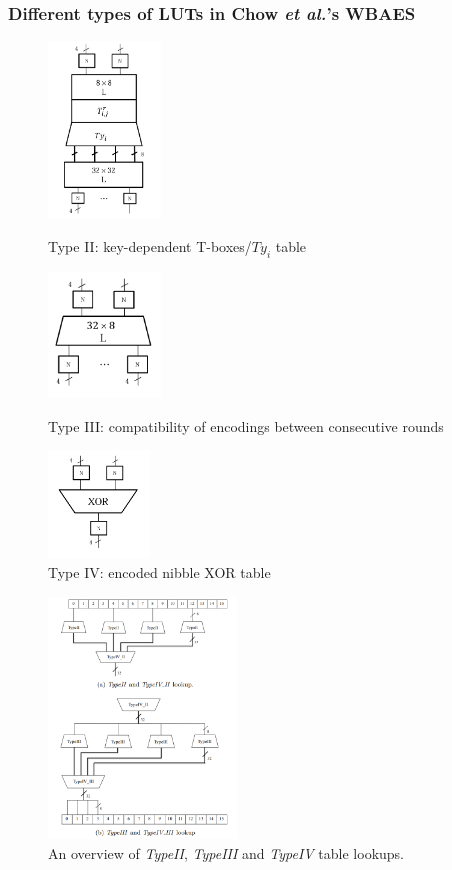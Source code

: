 \documentclass{beamer}
\begin{document}
\frame
{
	\frametitle{Different types of LUTs in Chow \textit{et al.}'s WBAES}
	\begin{figure}
		\centering
		\begin{minipage}[b]{0.3\textwidth}
			\includegraphics[width=3cm]{./pics/TMC.png}
			\caption{Type II: key-dependent T-boxes/$Ty_i$ table}
		\end{minipage}%
		\hspace{0.04\textwidth}%
		\begin{minipage}[b]{0.3\textwidth}
			\includegraphics[width=3cm]{./pics/type3.png}
			\caption{Type III: compatibility of encodings
				between consecutive rounds}
		\end{minipage}
		\hspace{0.04\textwidth}%
		\begin{minipage}[b]{0.2\textwidth}
			\includegraphics[width=2.7cm]{./pics/type4.png}
			\caption{Type IV: encoded nibble XOR table}
		\end{minipage}
	\end{figure}
}

\frame
{
	\begin{figure}
		\centering
		\includegraphics[width=5cm]{./pics/type234.png}
		\caption{An overview of \textit{TypeII}, \textit{TypeIII} and \textit{TypeIV} table lookups.}
	\end{figure}
}
\end{document}
